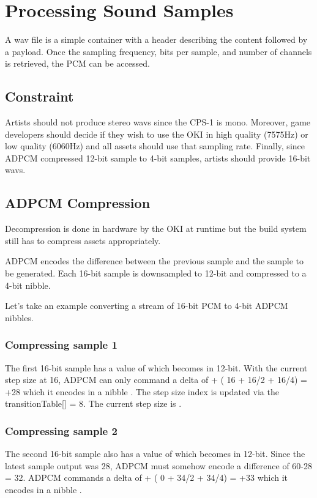 \section{Processing Sound Samples}
A wav file is a simple container with a header describing the content followed by a payload. Once the sampling frequency, bits per sample, and number of channels is retrieved, the PCM can be accessed.

\subsection{Constraint}
Artists should not produce stereo wavs since the CPS-1 is mono. Moreover, game developers should decide if they wish to use the OKI in high quality (7575Hz) or low quality (6060Hz) and all assets should use that sampling rate. Finally, since ADPCM compressed 12-bit sample to 4-bit samples, artists should provide 16-bit wavs.

\subsection{ADPCM Compression}
Decompression is done in hardware by the OKI at runtime but the build system still has to compress assets appropriately. 

ADPCM encodes the difference between the previous sample and the sample to be generated. Each 16-bit sample is downsampled to 12-bit and compressed to a 4-bit nibble\cite{adpcm_specs}.





Let's take an example converting a stream of 16-bit PCM to 4-bit ADPCM nibbles.



\subsubsection{Compressing sample 1}
The first 16-bit sample has a value of  which becomes  in 12-bit. With the current step size at 16, ADPCM can only command a delta of + ( 16 + 16/2 + 16/4) = +28 which it encodes in a nibble . The step size index is updated via the transitionTable[] = 8. The current step size is . 

\subsubsection{Compressing sample 2}
The second 16-bit sample also has a value of  which becomes  in 12-bit. Since the latest sample output was 28, ADPCM must somehow encode a difference of 60-28 = 32. ADPCM commands a delta of + ( 0 + 34/2 + 34/4) = +33 which it encodes in a nibble . 

